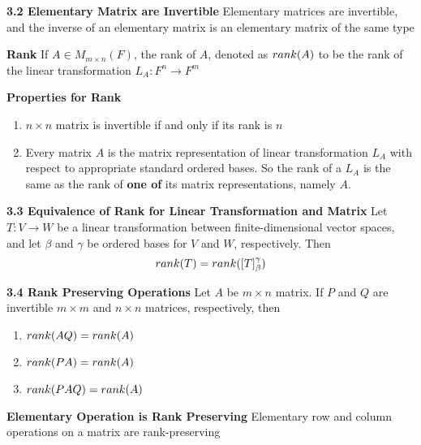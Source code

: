 \documentclass[11pt]{article}
\begin{document}
\begin{theorem*}
    \textbf{3.2 Elementary Matrix are Invertible} Elementary matrices are invertible, and the inverse of an elementary matrix is an elementary matrix of the same type
\end{theorem*}




\begin{defn*}
    \textbf{Rank} If $A\in M_{m\times n}(F)$, the rank of $A$, denoted as $rank(A)$ to be the rank of the linear transformation $L_A: F^n \to F^m$
\end{defn*}


\begin{defn*}
    \textbf{Properties for Rank} 
    \begin{enumerate}
        \item $n\times n$ matrix is invertible if and only if its rank is $n$
        \item Every matrix $A$ is the matrix representation of linear transformation $L_A$ with respect to appropriate standard ordered bases. So the rank of a $L_A$ is the same as the rank of \textbf{one of} its matrix representations, namely $A$.
    \end{enumerate}
\end{defn*}

\begin{theorem*}
    \textbf{3.3 Equivalence of Rank for Linear Transformation and Matrix} Let $T:V\to W$ be a linear transformation between finite-dimensional vector spaces, and let $\beta$ and $\gamma$ be ordered bases for $V$ and $W$, respectively. Then 
    \[
        rank(T) = rank(\left[ T \right]_{\beta}^{\gamma})    
    \]
\end{theorem*}

\begin{theorem*}
    \textbf{3.4 Rank Preserving Operations} Let $A$ be $m\times n$ matrix. If $P$ and $Q$ are invertible $m\times m$ and $n\times n$ matrices, respectively, then 
    \begin{enumerate}
        \item $rank(AQ) = rank(A)$
        \item $rank(PA) = rank(A)$
        \item $rank(PAQ) = rank(A)$
    \end{enumerate}
\end{theorem*}

\begin{corollary*}
    \textbf{Elementary Operation is Rank Preserving} Elementary row and column operations on a matrix are rank-preserving
\end{corollary*}
\end{document}
